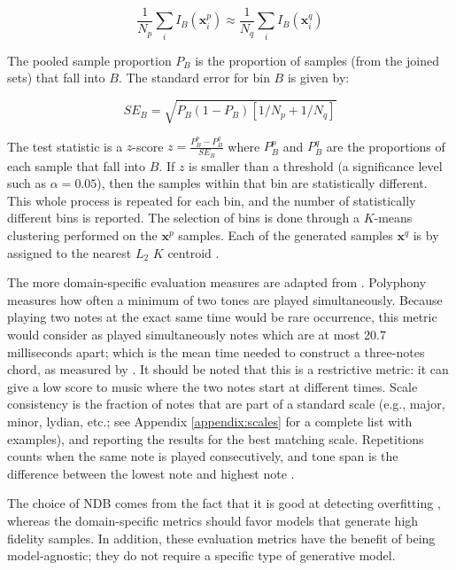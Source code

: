 \documentclass[a4paper]{book}
\begin{document}
\begin{equation}
    \frac{1}{N_p} \sum_i I_B(\mathbf{x}_i^p) \approx \frac{1}{N_q} \sum_i I_B(\mathbf{x}_i^q)
\end{equation}

The pooled sample proportion $P_B$ is the proportion of samples (from the joined sets) that fall into $B$. The standard error for bin $B$ is given by:

\begin{equation}
    SE_B = \sqrt{P_B (1 - P_B)[1 / N_p + 1 / N_q]}
\end{equation}

The test statistic is a $z$-score $z = \frac{P_B^p - P_B^q}{SE_B}$ where $P_B^p$ and $P_B^q$ are the proportions of each sample that fall into $B$. If $z$ is smaller than a threshold (a significance level such as $\alpha = 0.05$), then the samples within that bin are statistically different. This whole process is repeated for each bin, and the number of statistically different bins is reported. The selection of bins is done through a $K$-means clustering performed on the $\mathbf{x}^p$ samples. Each of the generated samples $\mathbf{x}^q$ is by assigned to the nearest $L_2$ $K$ centroid \parencite{richardson_gans_2018}.

The more domain-specific evaluation measures are adapted from \textcite{mogren_c-rnn-gan_2016}. Polyphony measures how often a minimum of two tones are played simultaneously. Because playing two notes at the exact same time would be rare occurrence, this metric would consider as played simultaneously notes which are at most 20.7 milliseconds apart; which is the mean time needed to construct a three-notes chord, as measured by \textcite{sandnes_human_2015}. It should be noted that this is a restrictive metric: it can give a low score to music where the two notes start at different times. Scale consistency is the fraction of notes that are part of a standard scale (e.g., major, minor, lydian, etc.; see Appendix \ref{appendix:scales} for a complete list with examples), and reporting the results for the best matching scale. Repetitions counts when the same note is played consecutively, and tone span is the difference between the lowest note and highest note \parencite[counted in semi-tones;][]{mogren_c-rnn-gan_2016}.

The choice of NDB comes from the fact that it is good at detecting overfitting \parencite[i.e., when NDB is low;][]{borji_pros_2018}, whereas the domain-specific metrics should favor models that generate high fidelity samples. In addition, these evaluation metrics have the benefit of being model-agnostic; they do not require a specific type of generative model.
\end{document}
